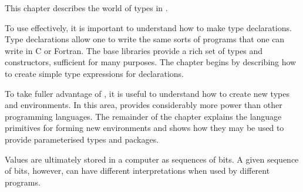 %
%

This chapter describes the world of types in \asharp{}.

To use \asharp{} effectively, it is important to understand how to 
make type declarations.  Type declarations allow one to
write the same sorts of programs that one can write in C or Fortran.
The base libraries provide a rich
set of types and constructors, sufficient for many purposes.
The chapter begins by describing how to create simple type expressions
for declarations.  

To take fuller advantage of \asharp{}, it is useful to understand how
to create new types and environments.  In this area, \asharp{} provides
considerably more power than other programming languages.
The remainder of the chapter explains the language primitives for
forming new environments and shows how they may be used to provide 
parameterised types and packages.


Values are ultimately stored in a computer as sequences of bits. 
A given sequence of bits, however, can have different interpretations
when used by different programs.

